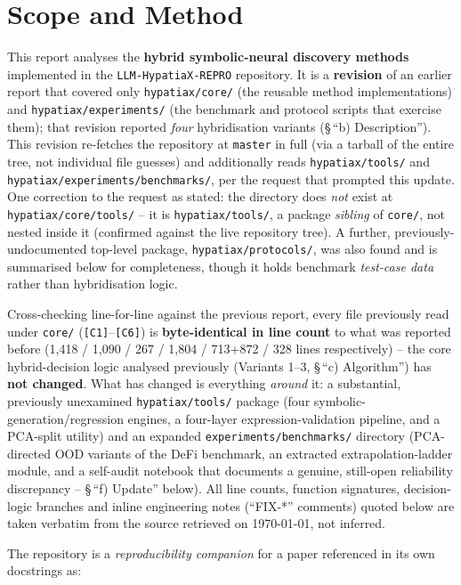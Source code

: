 \documentclass[11pt,a4paper]{article}
\newcommand{\code}[1]{\texttt{\small #1}}
\begin{document}
\section{Scope and Method}
This report analyses the \textbf{hybrid symbolic-neural discovery methods}
implemented in the \code{LLM-HypatiaX-REPRO} repository. It is a
\textbf{revision} of an earlier report that covered only
\code{hypatiax/core/} (the reusable method implementations) and
\code{hypatiax/experiments/} (the benchmark and protocol scripts that
exercise them); that revision reported \emph{four} hybridisation
variants (\S\,``b) Description''). This revision re-fetches the repository
at \code{master} in full (via a tarball of the entire tree, not individual
file guesses) and additionally reads \code{hypatiax/tools/} and
\code{hypatiax/experiments/benchmarks/}, per the request that prompted this
update. One correction to the request as stated: the directory does
\emph{not} exist at \code{hypatiax/core/tools/} -- it is
\code{hypatiax/tools/}, a package \emph{sibling} of \code{core/}, not
nested inside it (confirmed against the live repository tree). A further,
previously-undocumented top-level package, \code{hypatiax/protocols/}, was
also found and is summarised below for completeness, though it holds
benchmark \emph{test-case data} rather than hybridisation logic.

Cross-checking line-for-line against the previous report, every file
previously read under \code{core/} (\code{[C1]}--\code{[C6]}) is
\textbf{byte-identical in line count} to what was reported before (1{,}418 /
1{,}090 / 267 / 1{,}804 / 713+872 / 328 lines respectively) -- the core
hybrid-decision logic analysed previously (Variants 1--3, \S\,``c)
Algorithm'') has \textbf{not changed}. What has changed is everything
\emph{around} it: a substantial, previously unexamined \code{hypatiax/tools/}
package (four symbolic-generation/regression engines, a four-layer
expression-validation pipeline, and a PCA-split utility) and an expanded
\code{experiments/benchmarks/} directory (PCA-directed OOD variants of the
DeFi benchmark, an extracted extrapolation-ladder module, and a
self-audit notebook that documents a genuine, still-open reliability
discrepancy -- \S\,``f) Update'' below). All line counts, function
signatures, decision-logic branches and inline engineering notes
(``FIX-*'' comments) quoted below are taken verbatim from the source
retrieved on \today, not inferred.

The repository is a \emph{reproducibility companion} for a paper referenced
in its own docstrings as:
\end{document}
